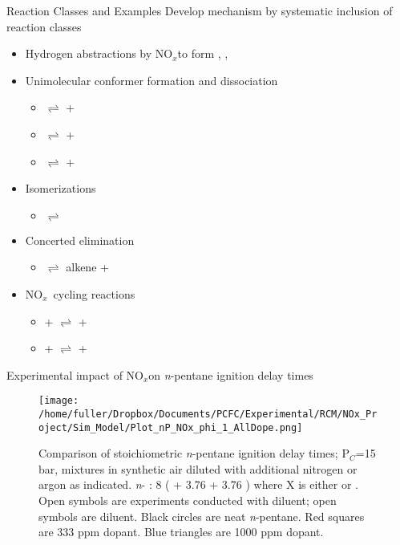 \documentclass[10pt,presentation]{beamer}
\newcommand{\nox}{NO$_x$} %
\begin{document}
\begin{frame}{Reaction Classes and Examples}
    Develop mechanism by systematic inclusion of reaction classes
    \begin{itemize}
        \item Hydrogen abstractions by \nox to form , , 
        \item Unimolecular conformer formation and dissociation
        \begin{itemize}
            \item {}$\rightleftharpoons$  + 
            \item {}$\rightleftharpoons$  + 
            \item {}$\rightleftharpoons$  + 
        \end{itemize}
        \item Isomerizations  
        \begin{itemize}
            \item {}$\rightleftharpoons$ 
        \end{itemize}
        \item Concerted  elimination
        \begin{itemize}
            \item {}$\rightleftharpoons$ alkene + 
        \end{itemize}
        \item \nox\ cycling reactions
        \begin{itemize}
            \item {} +  $\rightleftharpoons$  + 
            \item {} +  $\rightleftharpoons$  + 
        \end{itemize}
    \end{itemize}
\end{frame}


\begin{frame}{Experimental impact of \nox on {\it n}-pentane ignition delay times}
\begin{figure}
	\centering
	\texttt{[image: /home/fuller/Dropbox/Documents/PCFC/Experimental/RCM/NOx\_Project/Sim\_Model/Plot\_nP\_NOx\_phi\_1\_AllDope.png]}
	\caption{Comparison of stoichiometric {\it n}-pentane ignition delay times; P$_C$=15 bar, mixtures in synthetic air diluted with additional nitrogen or argon as indicated.
		{\it n}- : 8 ( + 3.76  + 3.76 ) where X is either  or .
		Open symbols are experiments conducted with  diluent; open symbols are  diluent.
		Black circles are neat {\it n}-pentane.
		Red squares are 333 ppm  dopant.
		Blue triangles are 1000 ppm  dopant.}
	\label{fig:phi1comp}
\end{figure}
\end{frame}
\end{document}
